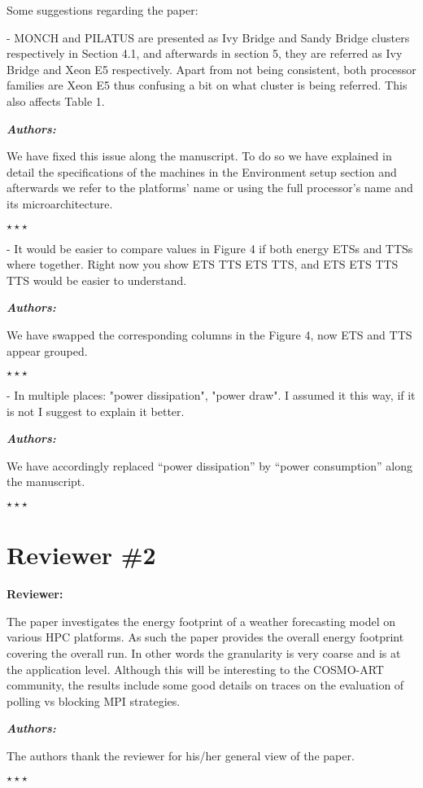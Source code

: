 \documentclass[a4paper,11pt]{article}
\newcounter{question}
\newcommand{\reviewerSay}{\vspace{0.2cm} {\bf \noindent } {\bf Reviewer:} \medskip \par}
\newcommand{\weReply}{\vspace{0.25cm} {\bf \noindent } \addtocounter{question}{1} \textbf{\emph{Authors:}} \medskip \em\par}
\newenvironment{weSay}{\bigskip \weReply \begin{it}}{\end{it}\begin{center} \samepage$\star \star \star$ \end{center}}
\begin{document}
Some suggestions regarding the paper:

- MONCH and PILATUS are presented as Ivy Bridge and Sandy Bridge clusters respectively in Section 4.1, 
and afterwards in section 5, they are referred as Ivy Bridge and Xeon E5 respectively. Apart from not 
being consistent, both processor families are Xeon E5 thus confusing a bit on what cluster is 
being referred. This also affects Table 1.

\begin{weSay}
We have fixed this issue along the manuscript. To do so we have explained in detail the specifications of the machines
in the Environment setup section and afterwards we refer to the platforms' name or using the
full processor's name and its microarchitecture.
\end{weSay}

- It would be easier to compare values in Figure 4 if both energy ETSs and TTSs where together. 
Right now you show ETS TTS ETS TTS, and ETS ETS TTS TTS would be easier to understand.

\begin{weSay}
We have swapped the corresponding columns in the Figure 4, now ETS and TTS appear grouped.
\end{weSay}

- In multiple places: "power dissipation", "power draw". I assumed it this way, if it is not 
I suggest to explain it better.

\begin{weSay}
We have accordingly replaced ``power dissipation'' by ``power consumption'' along the manuscript.
\end{weSay}


\section*{Reviewer \#2}

\reviewerSay
The paper investigates the energy footprint of a weather forecasting model on various HPC platforms. 
As such the paper provides the overall energy footprint covering the overall run. In other words the 
granularity is very coarse and is at the application level. Although this will be interesting to the 
COSMO-ART community, the results include some good details on traces  on the
evaluation of polling vs blocking MPI strategies.

\begin{weSay}
The authors thank the reviewer for his/her general view of the paper.
\end{weSay}
\end{document}
